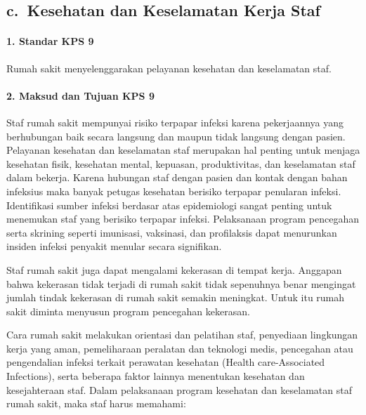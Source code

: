 \documentclass[
]{book}
\begin{document}
\hypertarget{c.-kesehatan-dan-keselamatan-kerja-staf}{%
\subsection*{c.~Kesehatan dan Keselamatan Kerja Staf}\label{c.-kesehatan-dan-keselamatan-kerja-staf}}

\hypertarget{standar-kps-9}{%
\paragraph*{1. Standar KPS 9}\label{standar-kps-9}}

Rumah sakit menyelenggarakan pelayanan kesehatan dan keselamatan staf.

\hypertarget{maksud-dan-tujuan-kps-9}{%
\paragraph*{2. Maksud dan Tujuan KPS 9}\label{maksud-dan-tujuan-kps-9}}

Staf rumah sakit mempunyai risiko terpapar infeksi karena pekerjaannya yang berhubungan baik secara langsung dan maupun tidak langsung dengan pasien. Pelayanan kesehatan dan keselamatan staf merupakan hal penting untuk menjaga kesehatan fisik, kesehatan mental, kepuasan, produktivitas, dan keselamatan staf dalam bekerja. Karena hubungan staf dengan pasien dan kontak dengan bahan infeksius maka banyak petugas kesehatan berisiko terpapar penularan infeksi. Identifikasi sumber infeksi berdasar atas epidemiologi sangat penting untuk menemukan staf yang berisiko terpapar infeksi. Pelaksanaan program pencegahan serta skrining seperti imunisasi, vaksinasi, dan profilaksis dapat menurunkan insiden infeksi penyakit menular secara signifikan.

Staf rumah sakit juga dapat mengalami kekerasan di tempat kerja. Anggapan bahwa kekerasan tidak terjadi di rumah sakit tidak sepenuhnya benar mengingat jumlah tindak kekerasan di rumah sakit semakin meningkat. Untuk itu rumah sakit diminta menyusun program pencegahan kekerasan.

Cara rumah sakit melakukan orientasi dan pelatihan staf, penyediaan lingkungan kerja yang aman, pemeliharaan peralatan dan teknologi medis, pencegahan atau pengendalian infeksi terkait perawatan kesehatan (Health care-Associated Infections), serta beberapa faktor lainnya menentukan kesehatan dan kesejahteraan staf.
Dalam pelaksanaan program kesehatan dan keselamatan staf rumah sakit, maka staf harus memahami:
\end{document}
